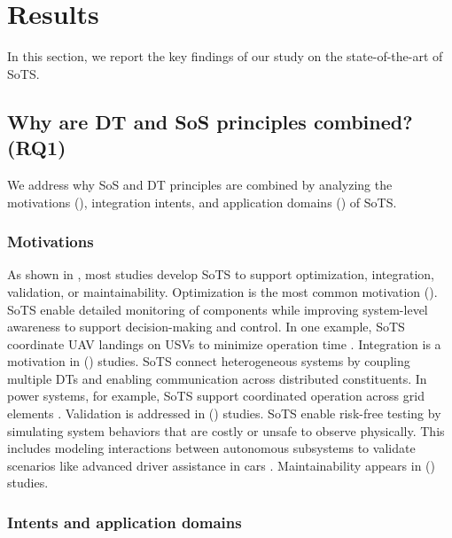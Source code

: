 \section{Results}\label{sec:literature-review-results}
In this section, we report the key findings of our study on the state-of-the-art of SoTS.





\subsection{Why are DT and SoS principles combined? (RQ1)}\label{sec:results-rq1}

We address why SoS and DT principles are combined by analyzing the motivations (), integration intents, and application domains () of SoTS.


\subsubsection{Motivations}\label{sec:motivations}

As shown in , most studies develop SoTS to support optimization, integration, validation, or maintainability.
Optimization is the most common motivation (). SoTS enable detailed monitoring of components while improving system-level awareness to support decision-making and control. In one example, SoTS coordinate UAV landings on USVs to minimize operation time \cite{li2022cognitive}.
Integration is a motivation in () studies. SoTS connect heterogeneous systems by coupling multiple DTs and enabling communication across distributed constituents. In power systems, for example, SoTS support coordinated operation across grid elements \cite{monsalve2021novel}.
Validation is addressed in () studies. SoTS enable risk-free testing by simulating system behaviors that are costly or unsafe to observe physically. This includes modeling interactions between autonomous subsystems to validate scenarios like advanced driver assistance in cars \cite{dahmen2022modeling}.
Maintainability appears in () studies.

\subsubsection{Intents and application domains}\label{sec:intents}

